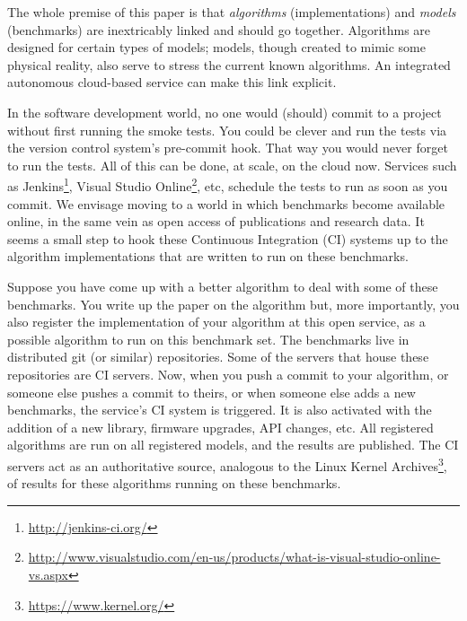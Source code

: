 \documentclass[conference]{IEEEtran}
\begin{document}



The whole premise of this paper is that {\emph{algorithms}}
(implementations) and {\emph{models}} (benchmarks) are inextricably
linked and should go together. Algorithms are designed for certain
types of models; models, though created to mimic some physical
reality, also serve to stress the current known algorithms. An
integrated autonomous cloud-based service can make this link explicit.

In the software development world, no one would (should) commit to a
project without first running the smoke tests. You could be clever and
run the tests via the version control system's pre-commit hook. That
way you would never forget to run the tests. All of this can be done,
at scale, on the cloud now. Services such as
Jenkins\footnote{\url{http://jenkins-ci.org/}}, Visual Studio
Online\footnote{\url{http://www.visualstudio.com/en-us/products/what-is-visual-studio-online-vs.aspx}},
etc, schedule the tests to run as soon as you commit. We envisage
moving to a world in which benchmarks become available online, in the
same vein as open access of publications and research data. It seems a
small step to hook these Continuous Integration (CI) systems up to the
algorithm implementations that are written to run on these benchmarks.

Suppose you have come up with a better algorithm to deal with some of
these benchmarks. You write up the paper on the algorithm but, more
importantly, you also register the implementation of your algorithm at
this open service, as a possible algorithm to run on this benchmark
set. The benchmarks live in distributed git (or similar)
repositories. Some of the servers that house these repositories are CI
servers. Now, when you push a commit to your algorithm, or someone
else pushes a commit to theirs, or when someone else adds a new
benchmarks, the service's CI system is triggered. It is also activated
with the addition of a new library, firmware upgrades, API changes,
etc. All registered algorithms are run on all registered models, and
the results are published. The CI servers act as an authoritative
source, analogous to the Linux Kernel
Archives\footnote{\url{https://www.kernel.org/}}, of results for these
algorithms running on these benchmarks.
\end{document}
